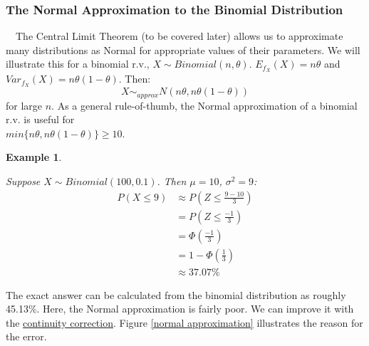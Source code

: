\documentclass[12pt,a4paper]{article}
\newtheorem{ex}[thm]{Example}
\begin{document}
\subsubsection{The Normal Approximation to the Binomial Distribution}\label{normal approx to bin}

$\quad$The Central Limit Theorem (to be covered later) allows us to approximate many distributions as Normal for appropriate values of their parameters. We will illustrate this for a binomial r.v., $X \sim Binomial(n,\theta)$. $E_{f_X}(X) = n\theta$ and $Var_{f_X}(X) = n\theta(1-\theta)$. Then:
$$X \sim_{approx} N(n\theta,n\theta(1-\theta))$$
for large $n$. As a general rule-of-thumb, the Normal approximation of a binomial r.v. is useful for\\$min\{n\theta,n\theta(1-\theta)\} \geq 10$.

\begin{ex}$\;$\par
\vspace{1cm}

Suppose $X \sim Binomial(100,0.1)$. Then $\mu = 10$, $\sigma^2 = 9$:
\begin{align*}
P(X \leq 9) &\approx P\left(Z \leq \frac{9-10}{3}\right)\\
&=P\left(Z \leq \frac{-1}{3}\right)\\
&= \Phi\left(\frac{-1}{3}\right)\\
&= 1-\Phi\left(\frac{1}{3}\right)\\
&\approx 37.07\%
\end{align*}
\end{ex}

The exact answer can be calculated from the binomial distribution as roughly 45.13\%. Here, the Normal approximation is fairly poor. We can improve it with the \underline{continuity correction}. Figure \ref{normal approximation} illustrates the reason for the error.
\end{document}

